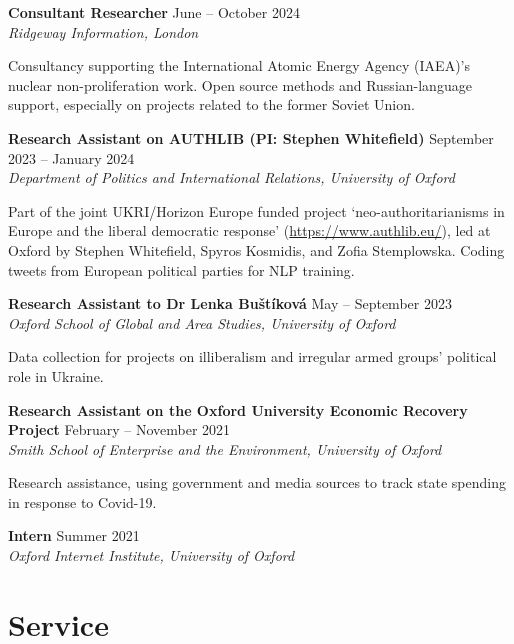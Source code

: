 \documentclass[11pt, a4paper]{article}
\begin{document}
\begin{samepage}
  \textbf{Consultant Researcher} \hfill June -- October 2024\\
  \textit{Ridgeway Information, London}

Consultancy supporting the International Atomic Energy Agency (IAEA)'s nuclear non-proliferation work. Open source methods and Russian-language support, especially on projects related to the former Soviet Union.
\end{samepage}

\begin{samepage}
  \textbf{Research Assistant on AUTHLIB (PI: Stephen Whitefield)} \hfill September 2023 -- January 2024\\
  \textit{Department of Politics and International Relations, University of Oxford}

Part of the joint UKRI/Horizon Europe funded project `neo-authoritarianisms in Europe and the liberal democratic response' (\url{https://www.authlib.eu/}), led at Oxford by Stephen Whitefield, Spyros Kosmidis, and Zofia Stemplowska. Coding tweets from European political parties for NLP training.
\end{samepage}

\begin{samepage}
  \textbf{Research Assistant to Dr Lenka Buštíková} \hfill May -- September 2023\\
  \textit{Oxford School of Global and Area Studies, University of Oxford}

Data collection for projects on illiberalism and irregular armed groups' political role in Ukraine.
\end{samepage}

\begin{samepage}
  \textbf{Research Assistant on the Oxford University Economic Recovery Project} \hfill February -- November 2021\\
  \textit{Smith School of Enterprise and the Environment, University of Oxford}

Research assistance, using government and media sources to track state spending in response to Covid-19.
\end{samepage}

\begin{samepage}
  \textbf{Intern} \hfill Summer 2021\\
  \textit{Oxford Internet Institute, University of Oxford}
\end{samepage}

\section{Service}
\end{document}
